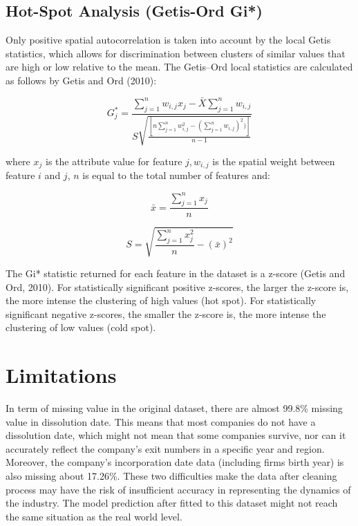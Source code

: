 \documentclass[
  12pt,
  oneside]{book}
\begin{document}
\hypertarget{hot-spot-analysis-getis-ord-gi}{%
\subsection{Hot-Spot Analysis (Getis-Ord Gi*)}\label{hot-spot-analysis-getis-ord-gi}}

Only positive spatial autocorrelation is taken into account by the local Getis statistics, which allows for discrimination between clusters of similar values that are high or low relative to the mean. The Getis--Ord local statistics are calculated as follows by Getis and Ord (2010):

\[
G^*_j = \frac{\sum_{j=1}^nw_{i,j}x_j - \bar{X}\sum_{j=1}^{n}w_{i,j}}{S\sqrt{\frac{[n\sum_{j=1}^{n}w^2_{i,j} - (\sum_{j=1}^{n}w_{i,j})^2)]}{n-1}}}
\]

where \(x_j\) is the attribute value for feature \(j, w_{i,j}\) is the spatial weight between feature \(i\) and \(j\), \(n\) is equal to the total number of features and:

\[ 
\bar{x} = \frac{\sum_{j=1}^{n}x_j}{n}
\]

\[
S = \sqrt{\frac{\sum_{j=1}^{n}x^2_j}{n} -(\bar{x})^2}
\]

The Gi* statistic returned for each feature in the dataset is a z-score (Getis and Ord, 2010). For statistically significant positive z-scores, the larger the z-score is, the more intense the clustering of high values (hot spot). For statistically significant negative z-scores, the smaller the z-score is, the more intense the clustering of low values (cold spot).

\hypertarget{limitations}{%
\section{Limitations}\label{limitations}}

In term of missing value in the original dataset, there are almost 99.8\% missing value in dissolution date. This means that most companies do not have a dissolution date, which might not mean that some companies survive, nor can it accurately reflect the company's exit numbers in a specific year and region. Moreover, the company's incorporation date data (including firms birth year) is also missing about 17.26\%. These two difficulties make the data after cleaning process may have the risk of insufficient accuracy in representing the dynamics of the industry. The model prediction after fitted to this dataset might not reach the same situation as the real world level.
\end{document}
